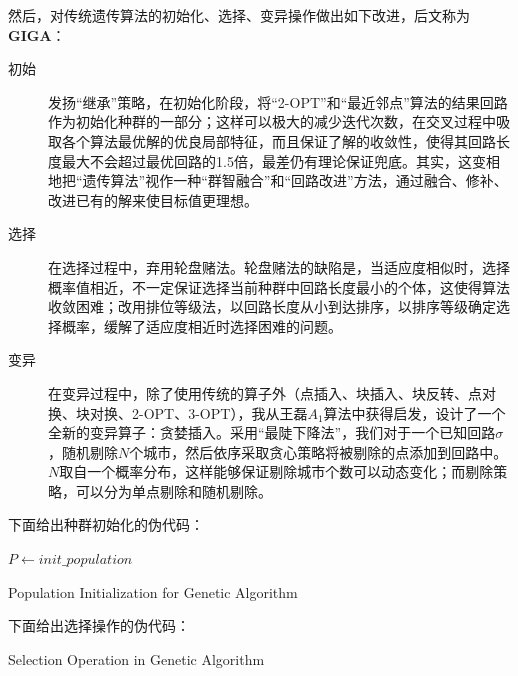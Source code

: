 \documentclass[12pt]{ctexart}
\begin{document}
然后，对传统遗传算法的初始化、选择、变异操作做出如下改进，后文称为\textbf{GIGA}：
\begin{description}
    \item[初始] 发扬“继承”策略，在初始化阶段，将“2-OPT”和“最近邻点”算法的结果回路作为初始化种群的一部分；这样可以极大的减少迭代次数，在交叉过程中吸取各个算法最优解的优良局部特征，而且保证了解的收敛性，使得其回路长度最大不会超过最优回路的1.5倍，最差仍有理论保证兜底。其实，这变相地把“遗传算法”视作一种“群智融合”和“回路改进”方法，通过融合、修补、改进已有的解来使目标值更理想。
    \item[选择] 在选择过程中，弃用轮盘赌法。轮盘赌法的缺陷是，当适应度相似时，选择概率值相近，不一定保证选择当前种群中回路长度最小的个体，这使得算法收敛困难；改用排位等级法，以回路长度从小到达排序，以排序等级确定选择概率，缓解了适应度相近时选择困难的问题。
    \item[变异] 在变异过程中，除了使用传统的算子外（点插入、块插入、块反转、点对换、块对换、2-OPT、3-OPT），我从王磊$A_1$算法中获得启发，设计了一个全新的变异算子：贪婪插入。采用“最陡下降法”，我们对于一个已知回路$\sigma$，随机剔除$N$个城市，然后依序采取贪心策略将被剔除的点添加到回路中。$N$取自一个概率分布，这样能够保证剔除城市个数可以动态变化；而剔除策略，可以分为单点剔除和随机剔除。
\end{description}

\newpage
下面给出种群初始化的伪代码：

\IncMargin{1em}
\begin{algorithm}[H]
    \BlankLine
    $P \leftarrow init\_population$\;
    \caption{Population Initialization for Genetic Algorithm}
\end{algorithm}
\DecMargin{1em}

下面给出选择操作的伪代码：

\IncMargin{1em}
\begin{algorithm}[H]
    \caption{Selection Operation in Genetic Algorithm}
\end{algorithm}
\DecMargin{1em}
\end{document}
